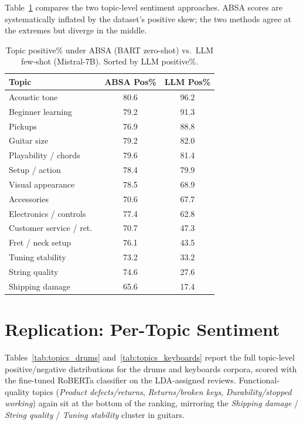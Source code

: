 \documentclass[11pt]{article}
\begin{document}
Table~\ref{tab:absa} compares the two topic-level sentiment approaches.
ABSA scores are systematically inflated by the dataset's positive skew;
the two methods agree at the extremes but diverge in the middle.

\begin{table}[h]
\centering
\small
\setlength{\tabcolsep}{3pt}
\caption{Topic positive\% under ABSA (BART zero-shot) vs.\
LLM few-shot (Mistral-7B). Sorted by LLM positive\%.}
\label{tab:absa}
\begin{tabular}{lcc}
\toprule
\textbf{Topic} & \textbf{ABSA Pos\%} & \textbf{LLM Pos\%} \\
\midrule
Acoustic tone            & 80.6 & 96.2 \\
Beginner learning        & 79.2 & 91.3 \\
Pickups                  & 76.9 & 88.8 \\
Guitar size              & 79.2 & 82.0 \\
Playability / chords     & 79.6 & 81.4 \\
Setup / action           & 78.4 & 79.9 \\
Visual appearance        & 78.5 & 68.9 \\
Accessories              & 70.6 & 67.7 \\
Electronics / controls   & 77.4 & 62.8 \\
Customer service / ret.\ & 70.7 & 47.3 \\
Fret / neck setup        & 76.1 & 43.5 \\
Tuning stability         & 73.2 & 33.2 \\
String quality           & 74.6 & 27.6 \\
Shipping damage          & 65.6 & 17.4 \\
\bottomrule
\end{tabular}
\end{table}

\section{Replication: Per-Topic Sentiment}
\label{app:rep_topics}

Tables~\ref{tab:topics_drums} and~\ref{tab:topics_keyboards} report
the full topic-level positive/negative distributions for the drums
and keyboards corpora, scored with the fine-tuned RoBERTa
classifier on the LDA-assigned reviews.
Functional-quality topics (\textit{Product defects/returns},
\textit{Returns/broken keys}, \textit{Durability/stopped working})
again sit at the bottom of the ranking, mirroring the
\textit{Shipping damage} / \textit{String quality} / \textit{Tuning
stability} cluster in guitars.
\end{document}
